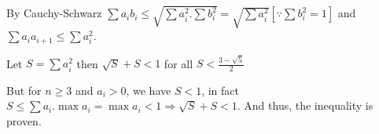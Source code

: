   By Cauchy-Schwarz $\sum a_ib_i\leq \sqrt{\sum a_i^2.\sum b_i^2} = \sqrt{\sum a_i^2}[\because \sum b_i^2 =
    1]$ and $\sum a_ia_{i + 1}\leq \sum a_i^2$.

  Let $S = \sum a_i^2$ then $\sqrt{S} + S < 1$ for all $S < \frac{3 - \sqrt{5}}{2}$

  But for $n\geq 3$ and $a_i > 0$, we have $S < 1$, in fact $S\leq \sum a_i.\max a_i = \max a_i <
  1\Rightarrow \sqrt{S} + S < 1$. And thus, the inequality is proven.












\stopitemize
